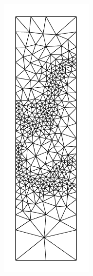 \documentclass{article}
\begin{document}
\begin{figure}[H]
\begin{subfigure}[b]{0.15\linewidth}
    \caption{}
  \end{subfigure}
  \begin{subfigure}[b]{0.15\linewidth}
    \includegraphics[width=\linewidth]{Fig_submesh2.png}

\end{subfigure}
\end{figure}
\end{document}
